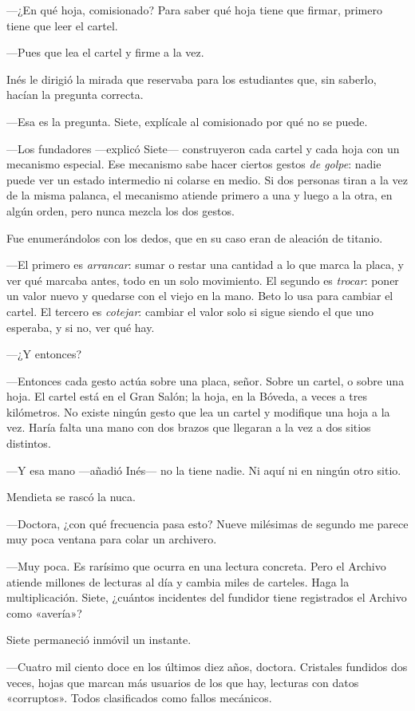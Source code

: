 ---¿En qué hoja, comisionado? Para saber qué hoja tiene que firmar, primero tiene que leer el cartel.

---Pues que lea el cartel y firme a la vez.

Inés le dirigió la mirada que reservaba para los estudiantes que, sin saberlo, hacían la pregunta correcta.

---Esa es la pregunta. Siete, explícale al comisionado por qué no se puede.

\escena
---Los fundadores ---explicó Siete--- construyeron cada cartel y cada hoja con un mecanismo especial. Ese mecanismo sabe hacer ciertos gestos \emph{de golpe}: nadie puede ver un estado intermedio ni colarse en medio. Si dos personas tiran a la vez de la misma palanca, el mecanismo atiende primero a una y luego a la otra, en algún orden, pero nunca mezcla los dos gestos.

Fue enumerándolos con los dedos, que en su caso eran de aleación de titanio.

---El primero es \emph{arrancar}: sumar o restar una cantidad a lo que marca la placa, y ver qué marcaba antes, todo en un solo movimiento. El segundo es \emph{trocar}: poner un valor nuevo y quedarse con el viejo en la mano. Beto lo usa para cambiar el cartel. El tercero es \emph{cotejar}: cambiar el valor solo si sigue siendo el que uno esperaba, y si no, ver qué hay.

---¿Y entonces?

---Entonces cada gesto actúa sobre una placa, señor. Sobre un cartel, o sobre una hoja. El cartel está en el Gran Salón; la hoja, en la Bóveda, a veces a tres kilómetros. No existe ningún gesto que lea un cartel y modifique una hoja a la vez. Haría falta una mano con dos brazos que llegaran a la vez a dos sitios distintos.

---Y esa mano ---añadió Inés--- no la tiene nadie. Ni aquí ni en ningún otro sitio.

Mendieta se rascó la nuca.

---Doctora, ¿con qué frecuencia pasa esto? Nueve milésimas de segundo me parece muy poca ventana para colar un archivero.

---Muy poca. Es rarísimo que ocurra en una lectura concreta. Pero el Archivo atiende millones de lecturas al día y cambia miles de carteles. Haga la multiplicación. Siete, ¿cuántos incidentes del fundidor tiene registrados el Archivo como «avería»?

Siete permaneció inmóvil un instante.

---Cuatro mil ciento doce en los últimos diez años, doctora. Cristales fundidos dos veces, hojas que marcan más usuarios de los que hay, lecturas con datos «corruptos». Todos clasificados como fallos mecánicos.

